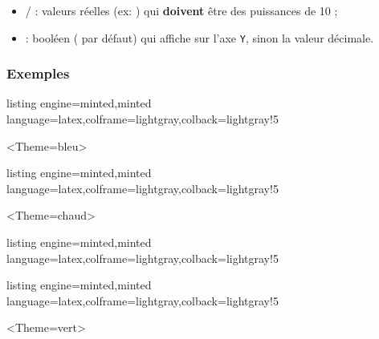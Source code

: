 \documentclass[11pt,a4paper]{ltxdoc}
\begin{document}
\begin{itemize}
  \item {}/ : valeurs réelles
  (ex: ) qui \textbf{doivent} être des
  puissances de 10 ;
  \item {} : booléen ( par défaut) qui affiche  sur l'axe \texttt{Y}, sinon la valeur décimale.
\end{itemize}

\subsubsection{Exemples}

\begin{tcblisting}{listing engine=minted,minted language=latex,colframe=lightgray,colback=lightgray!5}
\begin{GraphiqueTikzSemiLog}%
    [x=1.5cm,y=1.5cm,Xmin=0,Xmax=8,Ymin=0.001,Ymax=100,Xgrille=1,Xgrilles=0.5]%
    <Theme=bleu>
\end{GraphiqueTikzSemiLog}
\end{tcblisting}

\begin{tcblisting}{listing engine=minted,minted language=latex,colframe=lightgray,colback=lightgray!5}
\begin{GraphiqueTikzLogLog}%
    [x=1.5cm,y=1.5cm,Xmin=0.01,Xmax=1000,Ymin=0.1,Ymax=1000]<Theme=chaud>
  \TracerAxesGrillesLogLog[Elargir=2.5mm]
\end{GraphiqueTikzLogLog}
\end{tcblisting}

\begin{tcblisting}{listing engine=minted,minted language=latex,colframe=lightgray,colback=lightgray!5}
\begin{GraphiqueTikzSemiLog}%
    [x=1cm,y=1cm,Xmin=0,Xmax=8,Ymin=0.1,Ymax=10000,Xgrille=1,Xgrilles=0.5]
\end{GraphiqueTikzSemiLog}
\end{tcblisting}

\begin{tcblisting}{listing engine=minted,minted language=latex,colframe=lightgray,colback=lightgray!5}
\begin{GraphiqueTikzLogLog}%
    [x=1.5cm,y=1.5cm,Xmin=0.01,Xmax=1000,Ymin=0.1,Ymax=10000]<Theme=vert>
  \TracerAxesGrillesLogLog
\end{GraphiqueTikzLogLog}
\end{tcblisting}
\end{document}
